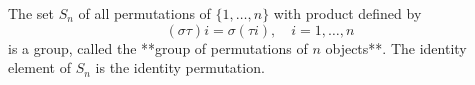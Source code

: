 The set $S_n$ of all permutations of $\{1, \dots, n\}$ with product defined by
$$(\sigma\tau)i = \sigma(\tau i), \quad i = 1, \dots, n$$
is a group, called the **group of permutations of $n$ objects**. The identity element of $S_n$ is the identity permutation.
